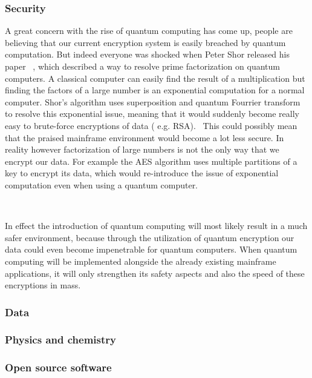 \subsubsection{Security}
A great concern with the rise of quantum computing has come up, people are believing that our current encryption system is easily breached by quantum computation. But indeed everyone was shocked when Peter Shor released his paper ~\textcite{Shor1994}, which described a way to resolve prime factorization on quantum computers. A classical computer can easily find the result of a multiplication but finding the factors of a large number is an exponential computation for a normal computer. Shor's algorithm uses superposition and quantum Fourrier transform to resolve this exponential issue, meaning that it would suddenly become really easy to brute-force encryptions of data ( e.g. RSA).~\autocite{Rivest1978} This could possibly mean that the praised mainframe environment would become a lot less secure. In reality however factorization of large numbers is not the only way that we encrypt our data. For example the AES algorithm uses multiple partitions of a key to encrypt its data, which would re-introduce the issue of exponential computation even when using a quantum computer.

~\autocite{Daemen2000} ~\autocite{IBM2019}

In effect the introduction of quantum computing will most likely result in a much safer environment, because through the utilization of quantum encryption our data could even become impenetrable for quantum computers. When quantum computing will be implemented alongside the already existing mainframe applications, it will only strengthen its safety aspects and also the speed of these encryptions in mass.
\subsubsection{Data}
\subsubsection{Physics and chemistry}
\subsubsection{Open source software}


\lipsum[7-20]
